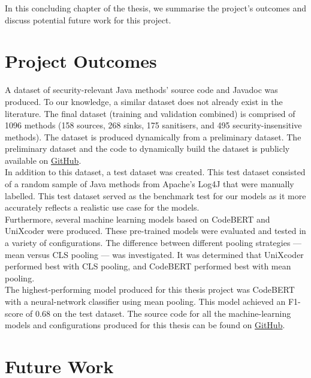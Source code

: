 \noindent
In this concluding chapter of the thesis, we summarise the project's outcomes and discuss potential future work for this project.

\section{Project Outcomes}

\noindent
A dataset of security-relevant Java methods' source code and Javadoc was produced. To our knowledge, a similar dataset does not already exist in the literature. The final dataset (training and validation combined) is comprised of 1096 methods (158 sources, 268 sinks, 175 sanitisers, and 495 security-insensitive methods). The dataset is produced dynamically from a preliminary dataset. The preliminary dataset and the code to dynamically build the dataset is publicly available on \href{https://github.com/uqcyber/SecurityMethodClassifier/tree/main/tools/dataset-manager}{GitHub}. \\

\noindent
In addition to this dataset, a test dataset was created. This test dataset consisted of a random sample of Java methods from Apache's Log4J that were manually labelled. This test dataset served as the benchmark test for our models as it more accurately reflects a realistic use case for the models. \\

\noindent
Furthermore, several machine learning models based on CodeBERT and UniXcoder were produced. These pre-trained models were evaluated and tested in a variety of configurations. The difference between different pooling strategies --- mean versus CLS pooling --- was investigated. It was determined that UniXcoder performed best with CLS pooling, and CodeBERT performed best with mean pooling. \\

\noindent
The highest-performing model produced for this thesis project was CodeBERT with a neural-network classifier using mean pooling. This model achieved an F1-score of $0.68$ on the test dataset. The source code for all the machine-learning models and configurations produced for this thesis can be found on \href{https://github.com/uqcyber/SecurityMethodClassifier/tree/main/models}{GitHub}. \\


\section{Future Work}

